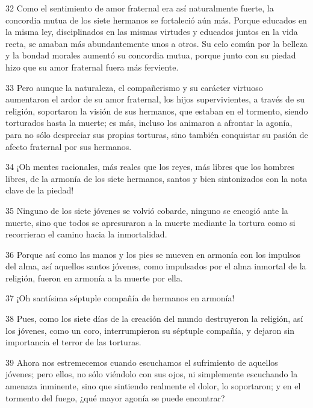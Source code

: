 \par 32 Como el sentimiento de amor fraternal era así naturalmente fuerte, la concordia mutua de los siete hermanos se fortaleció aún más. Porque educados en la misma ley, disciplinados en las mismas virtudes y educados juntos en la vida recta, se amaban más abundantemente unos a otros. Su celo común por la belleza y la bondad morales aumentó su concordia mutua, porque junto con su piedad hizo que su amor fraternal fuera más ferviente.

\par 33 Pero aunque la naturaleza, el compañerismo y su carácter virtuoso aumentaron el ardor de su amor fraternal, los hijos supervivientes, a través de su religión, soportaron la visión de sus hermanos, que estaban en el tormento, siendo torturados hasta la muerte; es más, incluso los animaron a afrontar la agonía, para no sólo despreciar sus propias torturas, sino también conquistar su pasión de afecto fraternal por sus hermanos.

\par 34 ¡Oh mentes racionales, más reales que los reyes, más libres que los hombres libres, de la armonía de los siete hermanos, santos y bien sintonizados con la nota clave de la piedad!

\par 35 Ninguno de los siete jóvenes se volvió cobarde, ninguno se encogió ante la muerte, sino que todos se apresuraron a la muerte mediante la tortura como si recorrieran el camino hacia la inmortalidad.

\par 36 Porque así como las manos y los pies se mueven en armonía con los impulsos del alma, así aquellos santos jóvenes, como impulsados ​​por el alma inmortal de la religión, fueron en armonía a la muerte por ella.

\par 37 ¡Oh santísima séptuple compañía de hermanos en armonía!

\par 38 Pues, como los siete días de la creación del mundo destruyeron la religión, así los jóvenes, como un coro, interrumpieron su séptuple compañía, y dejaron sin importancia el terror de las torturas.

\par 39 Ahora nos estremecemos cuando escuchamos el sufrimiento de aquellos jóvenes; pero ellos, no sólo viéndolo con sus ojos, ni simplemente escuchando la amenaza inminente, sino que sintiendo realmente el dolor, lo soportaron; y en el tormento del fuego, ¿qué mayor agonía se puede encontrar?

